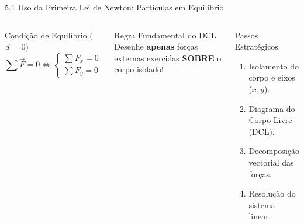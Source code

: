 \documentclass[10pt,aspectratio=169]{beamer}
\begin{document}
\begin{frame}{5.1 Uso da Primeira Lei de Newton: Partículas em Equilíbrio}
    \begin{columns}[T]
        \begin{block}{Condição de Equilíbrio ($\vec{a}=0$)}
            \small
            $$\sum \vec{F} = 0 \iff \begin{cases} \sum F_x = 0 \\ \sum F_y = 0 \end{cases}$$
        \end{block}
        \begin{alertblock}{Regra Fundamental do DCL}
            \small
            Desenhe \textbf{apenas} forças externas exercidas \textbf{SOBRE} o corpo isolado!
        \end{alertblock}

        \begin{block}{Passos Estratégicos}
            \small
            \begin{enumerate}\setlength{\itemsep}{2pt}
                \item Isolamento do corpo e eixos ($x,y$).
                \item Diagrama do Corpo Livre (DCL).
                \item Decomposição vectorial das forças.
                \item Resolução do sistema linear.
            \end{enumerate}
        \end{block}
    \end{columns}
\end{frame}
\end{document}
